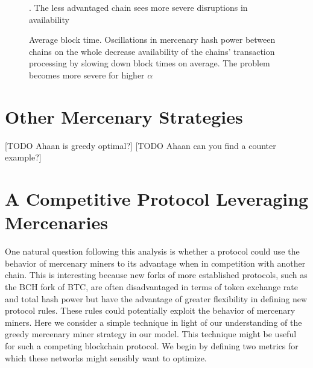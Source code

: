 \documentclass[10pt, preprint]{aastex}
\begin{document}
\begin{figure}
{		\label{fig:theo}
		}
	\qquad
	\qquad
	\caption{Average block time.  Oscillations in mercenary hash power between chains on the whole decrease availability of the chains' transaction processing by slowing down block times on average.  The problem becomes more severe for higher $\alpha$}.  The less advantaged chain sees more severe disruptions in availability
\end{figure}


\section{Other Mercenary Strategies}
[TODO Ahaan is greedy optimal?]
[TODO Ahaan can you find a counter example?]


\section{A Competitive Protocol Leveraging Mercenaries}
One natural question following this analysis is whether a protocol could use the behavior of mercenary miners to its advantage when in competition with another chain.  This is interesting because new forks of more established protocols, such as the BCH fork of BTC, are often disadvantaged in terms of token exchange rate and total hash power but have the advantage of greater flexibility in defining new protocol rules.  These rules could potentially exploit the behavior of mercenary miners.  Here we consider a simple technique in light of our understanding of the greedy mercenary miner strategy in our model.  This technique might be useful for such a competing blockchain protocol.  We begin by defining two metrics for which these networks might sensibly want to optimize.
\end{document}
